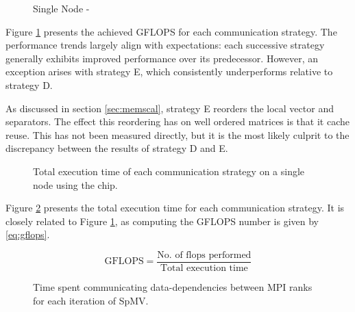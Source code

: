 \begin{figure}[htpb]
    \centering
    \caption{Single Node - }
    \label{fig:gflopsdefqsingle}
\end{figure}
Figure \ref{fig:gflopsdefqsingle} presents the achieved GFLOPS for each communication strategy. The performance trends largely align with expectations: each successive strategy generally exhibits improved performance over its predecessor. However, an exception arises with strategy E, which consistently underperforms relative to strategy D.
\medskip

As discussed in section \ref{sec:memscal}, strategy E reorders the local vector and separators. The effect this reordering has on well ordered matrices is that it cache reuse. This has not been measured directly, but it is the most likely culprit to the discrepancy between the results of strategy D and E.

 
\begin{figure}[htpb]
    \centering
    \caption{Total execution time of each communication strategy on a single node using the  chip.}
    \label{fig:tdefqsingle}
\end{figure}

Figure \ref{fig:tdefqsingle} presents the total execution time for each communication strategy. It is closely related to Figure \ref{fig:gflopsdefqsingle}, as computing the GFLOPS number is given by \ref{eq:gflops}.

\begin{equation}
    \label{eq:gflops}
    \text{GFLOPS} = \frac{\text{No. of flops performed}}{\text{Total execution time}}
\end{equation}

\begin{figure}[htpb]
    \centering
    \caption{Time spent communicating data-dependencies between MPI ranks for each iteration of SpMV.}
    \label{fig:tcommdefqsingle}
\end{figure}

